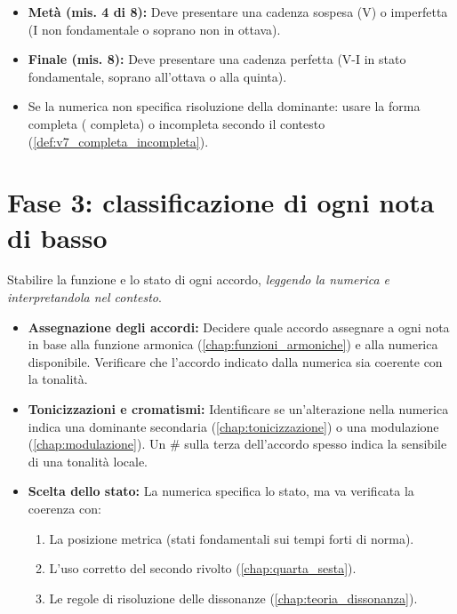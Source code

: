 \begin{regola}
	\label{reg:pianificazione_cadenzale_numerato}
	\begin{itemize}
		\item \textbf{Metà (mis. 4 di 8):} Deve presentare una cadenza sospesa (V) o imperfetta (I non fondamentale o soprano non in ottava).
		\item \textbf{Finale (mis. 8):} Deve presentare una cadenza perfetta (V-I in stato fondamentale, soprano all'ottava o alla quinta).
		\item Se la numerica non specifica risoluzione della dominante: usare la forma completa ( completa) o incompleta secondo il contesto (\ref{def:v7_completa_incompleta}).
	\end{itemize}
\end{regola}

\section{Fase 3: classificazione di ogni nota di basso}
\label{sec:fase3_numerato}

Stabilire la funzione e lo stato di ogni accordo, \textit{leggendo la numerica e interpretandola nel contesto}.

\begin{itemize}
	\item \textbf{Assegnazione degli accordi:} Decidere quale accordo assegnare a ogni nota in base alla funzione armonica (\ref{chap:funzioni_armoniche}) e alla numerica disponibile. Verificare che l'accordo indicato dalla numerica sia coerente con la tonalità.
	\item \textbf{Tonicizzazioni e cromatismi:} Identificare se un'alterazione nella numerica indica una dominante secondaria (\ref{chap:tonicizzazione}) o una modulazione (\ref{chap:modulazione}). Un \# sulla terza dell'accordo spesso indica la sensibile di una tonalità locale.
	\item \textbf{Scelta dello stato:} La numerica specifica lo stato, ma va verificata la coerenza con:
		\begin{enumerate}
			\item La posizione metrica (stati fondamentali sui tempi forti di norma).
			\item L'uso corretto del secondo rivolto (\ref{chap:quarta_sesta}).
			\item Le regole di risoluzione delle dissonanze (\ref{chap:teoria_dissonanza}).
		\end{enumerate}
\end{itemize}

